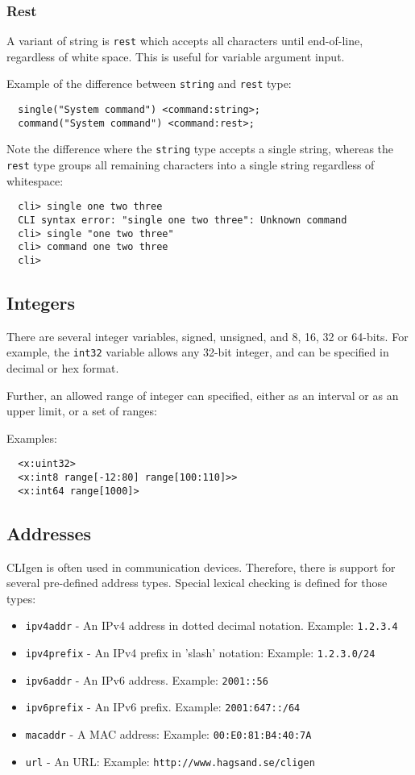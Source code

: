 \documentclass[a4paper, 10pt] {article}
\begin{document}
\subsubsection{Rest}
A variant of string is {\tt rest} which accepts all characters until end-of-line, regardless of white space. This is useful for variable argument input.

Example of the difference between {\tt string} and {\tt rest} type:
\begin{verbatim}
  single("System command") <command:string>;
  command("System command") <command:rest>;
\end{verbatim}

Note the difference where the {\tt string} type accepts a single string, whereas the {\tt rest} type groups all remaining characters into a single string regardless of whitespace:
\begin{verbatim}
  cli> single one two three
  CLI syntax error: "single one two three": Unknown command
  cli> single "one two three"
  cli> command one two three
  cli>
\end{verbatim}

\subsection{Integers}
There are several integer variables, signed, unsigned, and 8, 16, 32 or 64-bits. For example, the {\tt int32} variable allows any 32-bit integer, and can be specified in decimal or hex format. 

Further, an allowed range of integer can specified, either as an interval or as an upper limit, or a set of ranges:

Examples:
\begin{verbatim}
  <x:uint32>
  <x:int8 range[-12:80] range[100:110]>>
  <x:int64 range[1000]>
\end{verbatim}

\subsection{Addresses}

CLIgen is often used in communication devices. Therefore, there is
support for several pre-defined address types.  Special lexical
checking is defined for those types:

\begin{itemize}
\item {\tt ipv4addr} - An IPv4 address in dotted decimal notation. Example: {\tt 1.2.3.4}
\item {\tt ipv4prefix} - An IPv4 prefix in 'slash' notation: Example: {\tt 1.2.3.0/24}
\item {\tt ipv6addr} - An IPv6 address. Example: {\tt 2001::56}
\item {\tt ipv6prefix} - An IPv6 prefix. Example: {\tt 2001:647::/64}
\item {\tt macaddr} - A MAC address: Example: {\tt 00:E0:81:B4:40:7A}
\item {\tt url} - An URL: Example: {\tt http://www.hagsand.se/cligen}
\end{itemize}
\end{document}

